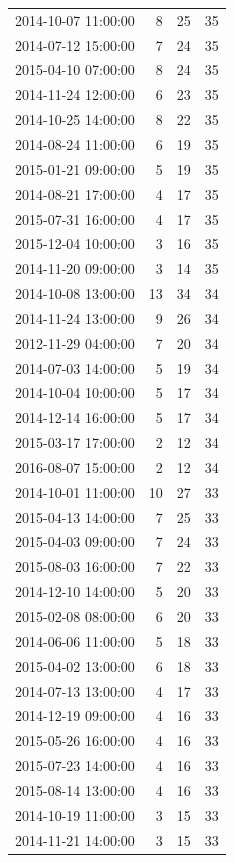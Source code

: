 \begin{tabular}{lrrr}
2014-10-07 11:00:00 & 8 & 25 & 35 \\
2014-07-12 15:00:00 & 7 & 24 & 35 \\
2015-04-10 07:00:00 & 8 & 24 & 35 \\
2014-11-24 12:00:00 & 6 & 23 & 35 \\
2014-10-25 14:00:00 & 8 & 22 & 35 \\
2014-08-24 11:00:00 & 6 & 19 & 35 \\
2015-01-21 09:00:00 & 5 & 19 & 35 \\
2014-08-21 17:00:00 & 4 & 17 & 35 \\
2015-07-31 16:00:00 & 4 & 17 & 35 \\
2015-12-04 10:00:00 & 3 & 16 & 35 \\
2014-11-20 09:00:00 & 3 & 14 & 35 \\
2014-10-08 13:00:00 & 13 & 34 & 34 \\
2014-11-24 13:00:00 & 9 & 26 & 34 \\
2012-11-29 04:00:00 & 7 & 20 & 34 \\
2014-07-03 14:00:00 & 5 & 19 & 34 \\
2014-10-04 10:00:00 & 5 & 17 & 34 \\
2014-12-14 16:00:00 & 5 & 17 & 34 \\
2015-03-17 17:00:00 & 2 & 12 & 34 \\
2016-08-07 15:00:00 & 2 & 12 & 34 \\
2014-10-01 11:00:00 & 10 & 27 & 33 \\
2015-04-13 14:00:00 & 7 & 25 & 33 \\
2015-04-03 09:00:00 & 7 & 24 & 33 \\
2015-08-03 16:00:00 & 7 & 22 & 33 \\
2014-12-10 14:00:00 & 5 & 20 & 33 \\
2015-02-08 08:00:00 & 6 & 20 & 33 \\
2014-06-06 11:00:00 & 5 & 18 & 33 \\
2015-04-02 13:00:00 & 6 & 18 & 33 \\
2014-07-13 13:00:00 & 4 & 17 & 33 \\
2014-12-19 09:00:00 & 4 & 16 & 33 \\
2015-05-26 16:00:00 & 4 & 16 & 33 \\
2015-07-23 14:00:00 & 4 & 16 & 33 \\
2015-08-14 13:00:00 & 4 & 16 & 33 \\
2014-10-19 11:00:00 & 3 & 15 & 33 \\
2014-11-21 14:00:00 & 3 & 15 & 33 \\

\end{tabular}
